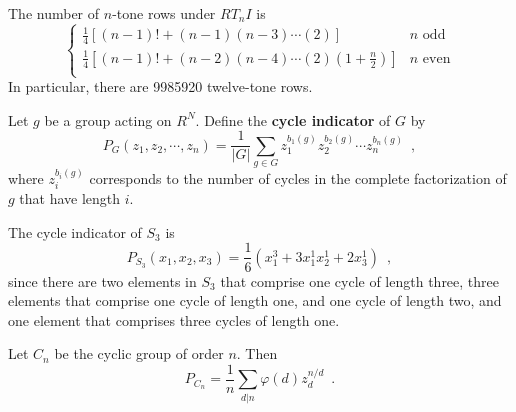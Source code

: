\begin{corollary}
	\cite[54]{Reiner1985}
	\cite[127]{FripertingerLackner2015}
	The number of $n$-tone rows under $RT_nI$ is
	\begin{equation}
		\begin{cases}
			\frac{1}{4} \left[ (n - 1)! + (n - 1) (n - 3) \cdots (2) \right]
			& n \text{ odd} \\
			\frac{1}{4} \left[ (n - 1)! + (n - 2) (n - 4) \cdots (2) (1 + \frac{n}{2})
			\right] & n \text{ even} \\
		\end{cases}
	\end{equation}
	In particular, there are 9985920 twelve-tone rows.
\end{corollary}

\begin{definition}
	\cite[87]{Aigner2007}
	Let $g$ be a group acting on $R^N$. Define the \textbf{cycle indicator} of $G$ by
	\begin{equation}
		P_G(z_1, z_2, \cdots, z_n) = \frac{1}{|G|} \sum_{g \in G} z_1^{b_1(g)} z_2^{b_2(g)}
		\cdots z_n^{b_n(g)} \enspace,
	\end{equation}
	where $z_i^{b_i(g)}$ corresponds to the number of cycles in the complete factorization
	of $g$ that have length $i$.
\end{definition}

\begin{example}
	The cycle indicator of $S_3$ is
	\begin{equation}
		P_{S_3}(x_1, x_2, x_3) = \frac{1}{6}(x_1^3 + 3 x_1^1 x_2^1 + 2 x_3^1) \enspace,
	\end{equation}
	since there are two elements in $S_3$ that comprise one cycle of length three,
	three elements that comprise one cycle of length one, and one cycle of length two,
	and one element that comprises three cycles of length one.
\end{example}

\begin{example}
	Let $C_n$ be the cyclic group of order $n$. Then
	\begin{equation}
		P_{C_n} = \frac{1}{n} \sum_{d | n} \varphi(d) z_d^{n / d} \enspace.
	\end{equation}
\end{example}

